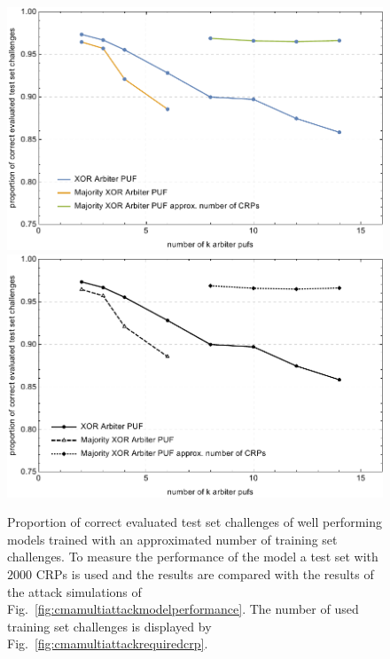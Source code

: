 \vspace{0.25cm}
\begin{figure}[ht]
\ifx{}\undefined
{}
\else
	\if{}
	\centering
	\includegraphics[width=1.00\textwidth]{images/xor-cma-attack-approx.pdf}
	\else
	\includegraphics[width=1.00\textwidth]{images/xor-cma-attack-approx_mono.pdf}
	\fi
\fi
\caption[Proportion of correct evaluated test set challenges for Majority \acs{XOR} \puf models with approximated required number of training set challenges]{Proportion of correct evaluated test set challenges of well performing models trained with an approximated number of training set challenges. To measure the performance of the model a test set with $2000$ \acp{CRP} is used and the results are compared with the results of the attack simulations of Fig.\ \ref{fig:cmamultiattackmodelperformance}. The number of used training set challenges is displayed by Fig.\ \ref{fig:cmamultiattackrequiredcrp}.}
\label{fig:cmamultiattackmvmodelperformance}
\end{figure}

